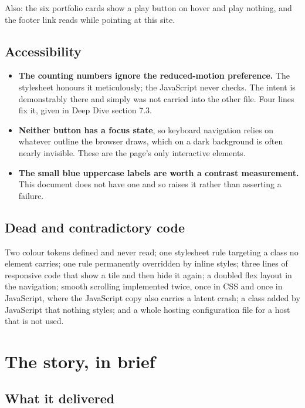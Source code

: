 \documentclass[11pt,a4paper]{article}
\begin{document}
Also: the six portfolio cards show a play button on hover and play nothing, and
the footer link reads  while pointing at this site.

\subsection{Accessibility}

\begin{itemize}
\item \textbf{The counting numbers ignore the reduced-motion preference.} The
  stylesheet honours it meticulously; the JavaScript never checks. The intent is
  demonstrably there and simply was not carried into the other file. Four lines
  fix it, given in Deep Dive section 7.3.
\item \textbf{Neither button has a focus state}, so keyboard navigation relies on
  whatever outline the browser draws, which on a dark background is often nearly
  invisible. These are the page's only interactive elements.
\item \textbf{The small blue uppercase labels are worth a contrast measurement.}
  This document does not have one and so raises it rather than asserting a
  failure.
\end{itemize}

\subsection{Dead and contradictory code}

Two colour tokens defined and never read; one stylesheet rule targeting a class no
element carries; one rule permanently overridden by inline styles; three lines of
responsive code that show a tile and then hide it again; a doubled flex layout in
the navigation; smooth scrolling implemented twice, once in CSS and once in
JavaScript, where the JavaScript copy also carries a latent crash; a class added
by JavaScript that nothing styles; and a whole hosting configuration file for a
host that is not used.

\section{The story, in brief}

\subsection{What it delivered}
\end{document}
